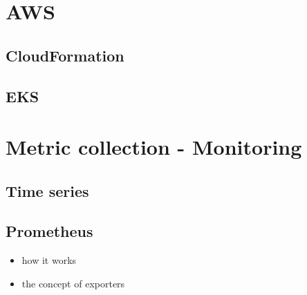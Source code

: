 \section{AWS}

\subsection{CloudFormation} \label{cloudformation}

\subsection{EKS}


\section{Metric collection - Monitoring}

\subsection{Time series}

\subsection{Prometheus}

\begin{itemize}
	\item how it works
	\item the concept of exporters
\end{itemize}

